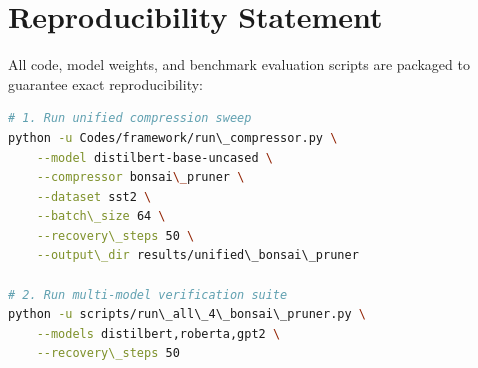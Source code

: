 \section{Reproducibility Statement}
All code, model weights, and benchmark evaluation scripts are packaged to guarantee exact reproducibility:
\begin{lstlisting}[language=bash]
# 1. Run unified compression sweep
python -u Codes/framework/run\_compressor.py \
    --model distilbert-base-uncased \
    --compressor bonsai\_pruner \
    --dataset sst2 \
    --batch\_size 64 \
    --recovery\_steps 50 \
    --output\_dir results/unified\_bonsai\_pruner

# 2. Run multi-model verification suite
python -u scripts/run\_all\_4\_bonsai\_pruner.py \
    --models distilbert,roberta,gpt2 \
    --recovery\_steps 50
\end{lstlisting}
